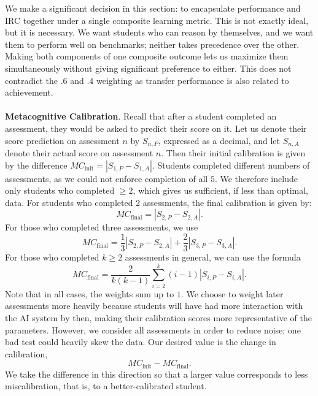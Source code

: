 \documentclass[12pt]{article}
\begin{document}
We make a significant decision in this section: to encapsulate performance and IRC together under a single composite learning metric. This is not exactly ideal, but it is necessary. We want students who can reason by themselves, and we want them to perform well on benchmarks; neither takes precedence over the other. Making both components of one composite outcome lets us maximize them simultaneously without giving significant preference to either. This does not contradict the $.6$ and $.4$ weighting as transfer performance is also related to achievement.
\\\\
\textbf{Metacognitive Calibration}. Recall that after a student completed an assessment, they would be asked to predict their score on it. Let us denote their score prediction on assessment $n$ by $S_{n,P}$, expressed as a decimal, and let $S_{n,A}$ denote their actual score on assessment $n$. Then their initial calibration is given by the difference
$MC_{\text{init}} = |S_{1,P} - S_{1,A}|$. Students completed different numbers of assessments, as we could not enforce completion of all $5$. We therefore include only students who completed $\ge 2$, which gives us sufficient, if less than optimal, data. For students who completed 2 assessments, the final calibration is given by:
\[MC_{\text{final}} = |S_{2,P} - S_{2,A}|.\] For those who completed three assessments, we use
\[MC_{\text{final}} = \frac 13|S_{2,P} - S_{2,A}| + \frac 23 |S_{3,P} - S_{3,A}|.\] For those who completed $k\ge 2$ assessments in general, we can use the formula
\[MC_{\text{final}} = \frac{2}{k(k-1)} \sum_{i=2}^{k} (i-1)|S_{i,P} - S_{i,A}|.\]
Note that in all cases, the weights sum up to $1$. We choose to weight later assessments more heavily because students will have had more interaction with the AI system by then, making their calibration scores more representative of the parameters. However, we consider all assessments in order to reduce noise; one bad test could heavily skew the data. Our desired value is the change in calibration, \[MC_{\text{init}} - MC_{\text{final}}.\] We take the difference in this direction so that a larger value corresponds to less miscalibration, that is, to a better-calibrated student.
\end{document}
